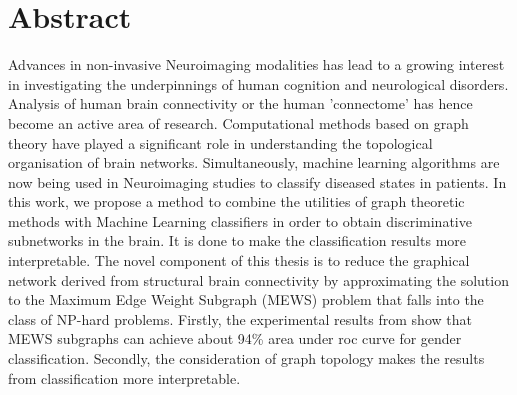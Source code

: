 \documentclass[msthesis.tex]{subfiles}
\begin{document}
\chapter{Abstract}
\thispagestyle{empty}

Advances in non-invasive Neuroimaging modalities has lead to a growing interest in investigating the underpinnings of human cognition and neurological disorders. Analysis of human brain connectivity or the human 'connectome' has hence become an active area of research. Computational methods based on graph theory have played a significant role in understanding the topological organisation of brain networks. Simultaneously, machine learning algorithms are now being used in Neuroimaging studies to classify diseased states in patients. In this work, we propose a method to combine the utilities of graph theoretic methods with Machine Learning classifiers in order to obtain discriminative subnetworks in the brain. It is done to make the classification results more interpretable. The novel component of this thesis is to reduce the graphical network derived from structural brain connectivity by approximating the solution to the Maximum Edge Weight Subgraph (MEWS) problem that falls into the class of NP-hard problems. Firstly, the experimental results from show that MEWS subgraphs can achieve about 94\% area under roc curve for gender classification. Secondly, the consideration of graph topology makes the results from classification more interpretable.
\end{document}
